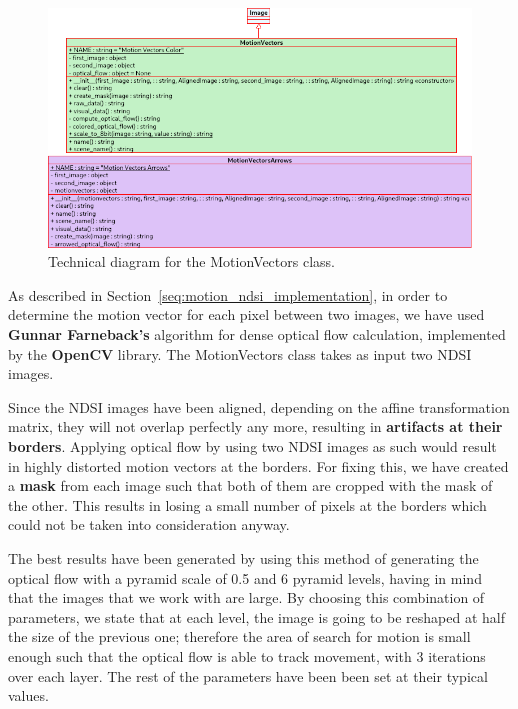 \documentclass[12pt, a4paper]{report}
\begin{document}
	\begin{figure}[h!]
		\centering
		\includegraphics[scale=0.7]{../images/motion_vectors_diagram.png}
		\caption{Technical diagram for the MotionVectors class.}
		\label{fig:motion_vectors_diagram}
	\end{figure}

	\par As described in Section~\ref{seq:motion_ndsi_implementation}, in order to determine the motion vector for each pixel between two images, we have used \textbf{Gunnar Farneback's} algorithm for dense optical flow calculation, implemented by the \textbf{OpenCV} library. The MotionVectors class takes as input two NDSI images.
	
	\par Since the NDSI images have been aligned, depending on the affine transformation matrix, they will not overlap perfectly any more, resulting in \textbf{artifacts at their borders}. Applying optical flow by using two NDSI images as such would result in highly distorted motion vectors at the borders. For fixing this, we have created a \textbf{mask} from each image such that both of them are cropped with the mask of the other. This results in losing a small number of pixels at the borders which could not be taken into consideration anyway.
	
	\par The best results have been generated by using this method of generating the optical flow with a pyramid scale of 0.5
	and 6 pyramid levels, having in mind that the images that we work with are large. By
	choosing this combination of parameters, we state that at each level, the image is going
	to be reshaped at half the size of the previous one; therefore the area of search for motion
	is small enough such that the optical flow is able to track movement, with 3 iterations over each layer. The rest of the parameters have been been set at their typical values.
	
\end{document}
